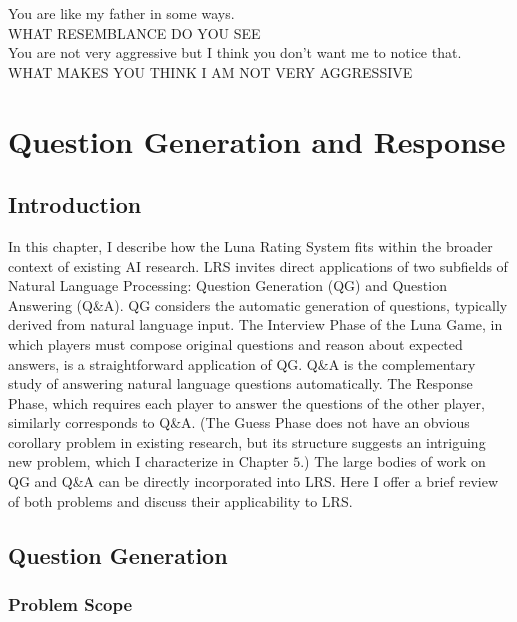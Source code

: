 \begin{savequote}[75mm]
You are like my father in some ways.\\
WHAT RESEMBLANCE DO YOU SEE\\
You are not very aggressive but I think you don't want me to notice that.\\
WHAT MAKES YOU THINK I AM NOT VERY AGGRESSIVE
\end{savequote}
\chapter{Question Generation and Response}

\section{Introduction}

In this chapter, I describe how the Luna Rating System fits within the broader context of existing AI research. LRS invites direct applications of two subfields of Natural Language Processing: Question Generation (QG) and Question Answering (Q\&A). QG considers the automatic generation of questions, typically derived from natural language input. The Interview Phase of the Luna Game, in which players must compose original questions and reason about expected answers, is a straightforward application of QG. Q\&A is the complementary study of answering natural language questions automatically. The Response Phase, which requires each player to answer the questions of the other player, similarly corresponds to Q\&A. (The Guess Phase does not have an obvious corollary problem in existing research, but its structure suggests an intriguing new problem, which I characterize in Chapter $5$.) The large bodies of work on QG and Q\&A can be directly incorporated into LRS. Here I offer a brief review of both problems and discuss their applicability to LRS. 

\section{Question Generation}

\subsection{Problem Scope}

